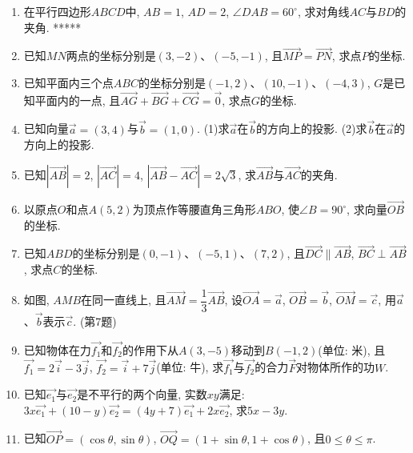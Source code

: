 \documentclass[10pt,a4paper]{article}
\begin{document}
\begin{enumerate}[1.]
\begin{center}
\end{center}
\item 在平行四边形$ABCD$中, $AB=1$, $AD=2$, $\angle DAB=60^{\circ }$, 求对角线$AC$与$BD$的夹角.
*****
\item 已知$MN$两点的坐标分别是$(3,-2)$、$(-5,-1)$, 且$\overrightarrow{MP}=\overrightarrow{PN}$, 求点$P$的坐标.
\item 已知平面内三个点$ABC$的坐标分别是$(-1,2)$、$(10,-1)$、$(-4,3)$, $G$是已知平面内的一点, 且$\overrightarrow{AG}+\overrightarrow{BG}+\overrightarrow{CG}=\overrightarrow 0$, 求点$G$的坐标.
\item 已知向量$\overrightarrow a=(3,4)$与$\overrightarrow b=(1,0)$.
(1)求$\overrightarrow a$在$\overrightarrow b$的方向上的投影.
(2)求$\overrightarrow b$在$\overrightarrow a$的方向上的投影.
\item 已知$|\overrightarrow{AB}|=2$, $|\overrightarrow{AC}|=4$, $|\overrightarrow{AB}-\overrightarrow{AC}|=2\sqrt 3$, 求$\overrightarrow{AB}$与$\overrightarrow{AC}$的夹角.
\item 以原点$O$和点$A(5,2)$为顶点作等腰直角三角形$ABO$, 使$\angle B=90^{\circ }$, 求向量$\overrightarrow{OB}$的坐标.
\item 已知$ABD$的坐标分别是$(0,-1)$、$(-5,1)$、$(7,2)$, 且$\overrightarrow{DC}\parallel \overrightarrow{AB}$, $\overrightarrow{BC}\perp \overrightarrow{AB}$, 求点$C$的坐标.
\item 如图, $AMB$在同一直线上, 且$\overrightarrow{AM}=\dfrac 13\overrightarrow{AB}$, 设$\overrightarrow{OA}=\overrightarrow a$, $\overrightarrow{OB}=\overrightarrow b$, $\overrightarrow{OM}=\overrightarrow c$, 用$\overrightarrow a$、$\overrightarrow b$表示$\overrightarrow c$.
(第7题)
\item 已知物体在力$\overrightarrow{f_1}$和$\overrightarrow{f_2}$的作用下从$A(3,-5)$移动到$B(-1,2)$(单位: 米), 且$\overrightarrow{f_1}=2\overrightarrow i-3\overrightarrow j$, $\overrightarrow{f_2}=\overrightarrow i+7\overrightarrow j$(单位: 牛), 求$\overrightarrow{f_1}$与$\overrightarrow{f_2}$的合力$\overrightarrow F$对物体所作的功$W$.
\item 已知$\overrightarrow{e_1}$与$\overrightarrow{e_2}$是不平行的两个向量, 实数$xy$满足: $3x\overrightarrow{e_1}+(10-y)\overrightarrow{e_2}=(4y+7)\overrightarrow{e_1}+2x\overrightarrow{e_2}$, 求$5x-3y$.
\item 已知$\overrightarrow{OP}=(\cos \theta ,\sin \theta)$, $\overrightarrow{OQ}=(1+\sin \theta ,1+\cos \theta)$, 且$0\le \theta \le \pi$.

\end{enumerate}
\end{document}

